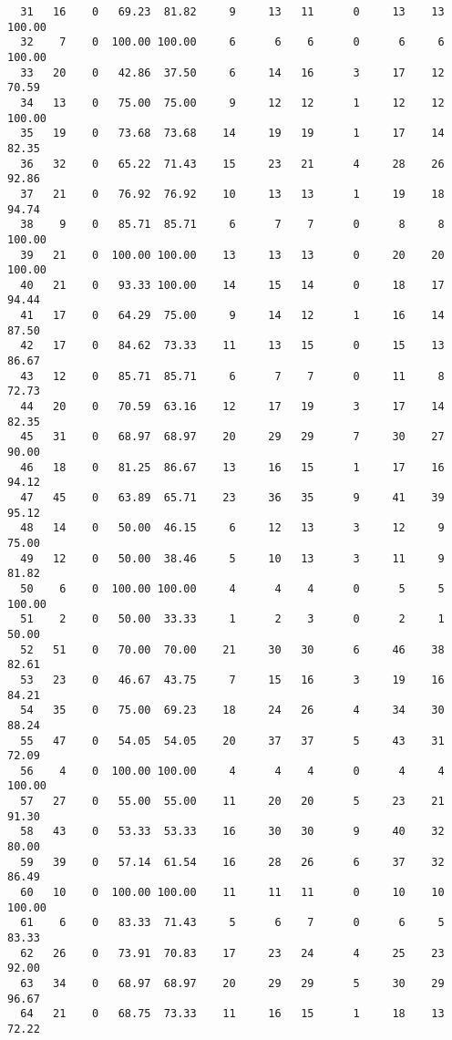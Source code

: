 \begin{verbatim}
  31   16    0   69.23  81.82     9     13   11      0     13    13   100.00
  32    7    0  100.00 100.00     6      6    6      0      6     6   100.00
  33   20    0   42.86  37.50     6     14   16      3     17    12    70.59
  34   13    0   75.00  75.00     9     12   12      1     12    12   100.00
  35   19    0   73.68  73.68    14     19   19      1     17    14    82.35
  36   32    0   65.22  71.43    15     23   21      4     28    26    92.86
  37   21    0   76.92  76.92    10     13   13      1     19    18    94.74
  38    9    0   85.71  85.71     6      7    7      0      8     8   100.00
  39   21    0  100.00 100.00    13     13   13      0     20    20   100.00
  40   21    0   93.33 100.00    14     15   14      0     18    17    94.44
  41   17    0   64.29  75.00     9     14   12      1     16    14    87.50
  42   17    0   84.62  73.33    11     13   15      0     15    13    86.67
  43   12    0   85.71  85.71     6      7    7      0     11     8    72.73
  44   20    0   70.59  63.16    12     17   19      3     17    14    82.35
  45   31    0   68.97  68.97    20     29   29      7     30    27    90.00
  46   18    0   81.25  86.67    13     16   15      1     17    16    94.12
  47   45    0   63.89  65.71    23     36   35      9     41    39    95.12
  48   14    0   50.00  46.15     6     12   13      3     12     9    75.00
  49   12    0   50.00  38.46     5     10   13      3     11     9    81.82
  50    6    0  100.00 100.00     4      4    4      0      5     5   100.00
  51    2    0   50.00  33.33     1      2    3      0      2     1    50.00
  52   51    0   70.00  70.00    21     30   30      6     46    38    82.61
  53   23    0   46.67  43.75     7     15   16      3     19    16    84.21
  54   35    0   75.00  69.23    18     24   26      4     34    30    88.24
  55   47    0   54.05  54.05    20     37   37      5     43    31    72.09
  56    4    0  100.00 100.00     4      4    4      0      4     4   100.00
  57   27    0   55.00  55.00    11     20   20      5     23    21    91.30
  58   43    0   53.33  53.33    16     30   30      9     40    32    80.00
  59   39    0   57.14  61.54    16     28   26      6     37    32    86.49
  60   10    0  100.00 100.00    11     11   11      0     10    10   100.00
  61    6    0   83.33  71.43     5      6    7      0      6     5    83.33
  62   26    0   73.91  70.83    17     23   24      4     25    23    92.00
  63   34    0   68.97  68.97    20     29   29      5     30    29    96.67
  64   21    0   68.75  73.33    11     16   15      1     18    13    72.22

\end{verbatim}
